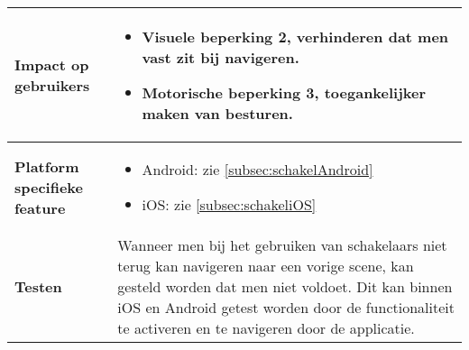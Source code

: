 \begin{table}[H]
\begin{tabular}{|l|p{12cm}|}
        \hline
        \textbf{Impact op gebruikers}         &  
        \begin{itemize}
            \item Visuele beperking 2, verhinderen dat men vast zit bij navigeren.
            \item Motorische beperking 3, toegankelijker maken van besturen.
        \end{itemize}                                                                                                                                                                                                                                                                                                                                                                                                                    \\ 
        \hline
        \textbf{Platform specifieke feature}  & \begin{itemize}
            \item Android: zie \ref{subsec:schakelAndroid}
            \item iOS: zie \ref{subsec:schakeliOS}
        \end{itemize}                                                                                                                                                                                                                                                                                                                                   \\ 
        \hline
        \textbf{Testen}                       & Wanneer men bij het gebruiken van schakelaars niet terug kan navigeren naar een vorige scene, kan gesteld worden dat men niet voldoet.  Dit kan binnen iOS en Android getest worden door de functionaliteit te activeren en te navigeren door de applicatie.                                                                                                                                                                                                                                                             \\
        \hline
    \end{tabular}
\end{table}

